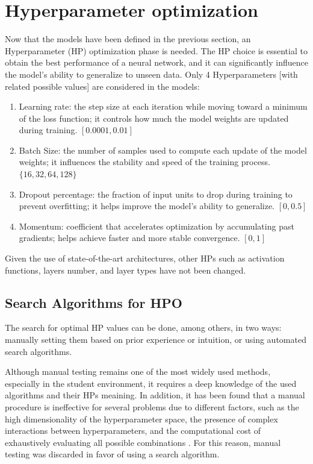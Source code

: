 \section{Hyperparameter optimization}

Now that the models have been defined in the previous section, an Hyperparameter (HP) optimization phase 
is needed.
The HP choice is essential to obtain the best performance of a neural network, and it can significantly influence the model's ability to generalize to unseen data. 
\noindent
Only 4 Hyperparameters [with related possible values] are considered in the models:
\begin{enumerate}
    \item Learning rate: the step size at each iteration while moving toward a minimum of the loss function; it controls how much the model weights are updated during training. $[0.0001,0.01]$
    \item Batch Size: the number of samples used to compute each update of the model weights; it influences the stability and speed of the training process. $\{16,32,64,128\}$
    \item Dropout percentage: the fraction of input units to drop during training to prevent overfitting; it helps improve the model's ability to generalize. $[0,0.5]$
    \item Momentum: coefficient that accelerates optimization by accumulating past gradients; helps achieve faster and more stable convergence. $[0,1]$
\end{enumerate}

Given the use of state-of-the-art architectures, other HPs such as activation functions, layers number, and layer types have not been changed.

\subsection{Search Algorithms for HPO}
The search for optimal HP values can be done, among others, in two ways: manually setting them based on prior experience or 
intuition, or using automated search algorithms.

Although manual testing remains one of the most widely used methods, especially in the student environment, it
requires a deep knowledge of the used algorithms and their HPs meaining. In addition, it has been found that 
a manual procedure is ineffective for several problems due to different factors, such as the high dimensionality 
of the hyperparameter space, the presence of complex interactions between hyperparameters, and the computational 
cost of exhaustively evaluating all possible combinations \cite{YANG2020295}. For this reason, manual testing
was discarded in favor of using a search algorithm.

